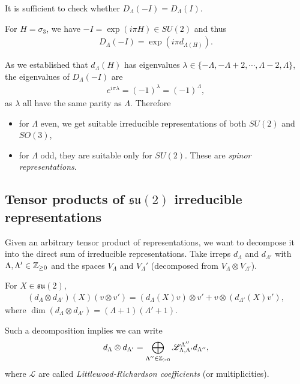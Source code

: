 It is sufficient to check whether $D_{\Lambda}\left( -I \right) = D_{\Lambda}\left( I \right) $.

For $H = \sigma_3$, we have $- I = \exp \left( i \pi H \right) \in SU \left( 2 \right) $ and thus
\begin{align}
    D_{\Lambda}\left( -I \right)  = \exp \left( i \pi d_{\Lambda \left( H \right) } \right) 
.\end{align}

As we established that $d_{\Lambda}\left( H \right) $ has eigenvalues $\lambda \in \{-\Lambda, - \Lambda + 2, \cdots, \Lambda - 2, \Lambda \}$, the eigenvalues of $D_{\Lambda}\left( -I \right) $ are
\begin{align}
    e^{i \pi \lambda} = \left( -1 \right)^{\lambda} = \left( -1 \right)^{\Lambda}
,\end{align}
as $\lambda$ all have the same parity as $\Lambda$. Therefore
\begin{itemize}
    \item for $\Lambda$ even, we get suitable irreducible representations of both $SU \left( 2 \right) $ and $SO \left( 3 \right) $,
    \item for $\Lambda$ odd, they are suitable only for $SU \left( 2 \right) $. These are \textit{spinor representations}.
\end{itemize}

\subsection{Tensor products of $\mathfrak{su}\left( 2 \right) $ irreducible representations}

Given an arbitrary tensor product of representations, we want to decompose it into the direct sum of irreducible representations. Take irreps $d_{\Lambda}$ and $d_{\Lambda'}$ with $\Lambda, \Lambda' \in \mathbb{Z}_{\geq 0}$ and the spaces $V_{\Lambda}$ and $V_{\Lambda}'$ (decomposed from $V_{\Lambda} \otimes V_{\Lambda'}$).

For $X \in \mathfrak{su}\left( 2 \right) $,
\begin{align}
    \left( d_{\Lambda} \otimes d_{\Lambda'} \right) \left( X \right) \left( v \otimes v' \right) = \left( d_{\Lambda} \left( X \right) v \right)  \otimes v' + v \otimes \left( d_{\Lambda'}\left( X \right) v' \right) 
,\end{align}
where $\dim \left( d_{\Lambda} \otimes d_{\Lambda'} \right) = \left( \Lambda + 1 \right) \left( \Lambda' + 1 \right) $.

Such a decomposition implies we can write
\begin{align}
    d_{\Lambda} \otimes d_{\Lambda'} = \bigoplus_{\Lambda'' \in \mathbb{Z}_{>0}} \mathscr{L}_{\Lambda, \Lambda'}^{\Lambda''} d_{\Lambda''}
,\end{align}
where $\mathscr{L}$ are called \textit{Littlewood-Richardson coefficients} (or multiplicities).


